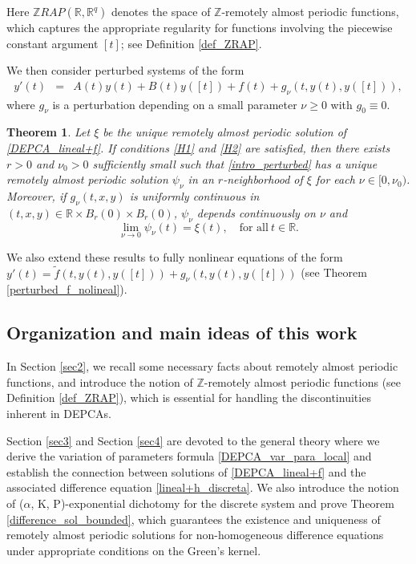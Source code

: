 \documentclass[english,,reqno]{amsart}
\numberwithin{equation}{section}
\theoremstyle{plain}
\newtheorem{thm}{Theorem}[section]
\theoremstyle{definition}
\theoremstyle{remark}
\begin{document}
Here $\mathbb{Z}RAP(\mathbb{R}, \mathbb{R}^q)$ denotes the space of $\mathbb{Z}$-remotely almost periodic functions, which captures the appropriate regularity for functions involving the piecewise constant argument $[t]$; see Definition \ref{def_ZRAP}.

We then consider perturbed systems of the form
\begin{eqnarray}
y'(t) &=& A(t)y(t) + B(t)y([t]) + f(t) + g_{\nu}(t, y(t), y([t])), \label{intro_perturbed}
\end{eqnarray}
where $g_{\nu}$ is a perturbation depending on a small parameter $\nu \geq 0$ with $g_0 \equiv 0$.

\begin{thm}\label{teo_perturbada_depca}
Let $\xi$ be the unique remotely almost periodic solution of \eqref{DEPCA_lineal+f}.  
If conditions \ref{H1} and \ref{H2} are satisfied,  
then there exists $r > 0$ and $\nu_0 > 0$ sufficiently small such that \eqref{intro_perturbed}  
has a unique remotely almost periodic solution $\psi_\nu$ in an $r$-neighborhood of $\xi$  
for each $\nu \in [0, \nu_0)$.  
Moreover, if $g_\nu(t, x, y)$ is uniformly continuous in $(t, x, y) \in \mathbb{R} \times B_r(0) \times B_r(0)$,  
 $\psi_\nu$ depends continuously on $\nu$ and  
\[
\lim_{\nu \to 0} \psi_\nu(t) = \xi(t), \quad \mbox{for all}~{} t\in\mathbb{R}.
\]
\end{thm}

We also extend these results to fully nonlinear equations of the form $y'(t) = \tilde{f}(t, y(t), y([t])) + g_{\nu}(t, y(t), y([t]))$ (see Theorem \ref{perturbed_f_nolineal}).



\subsection{Organization and main ideas of this work} 
In Section \ref{sec2}, we recall some necessary facts about remotely almost periodic functions, and introduce the notion of $\mathbb{Z}$-remotely almost periodic functions (see Definition \ref{def_ZRAP}), which is essential for handling the discontinuities inherent in DEPCAs.

Section \ref{sec3} and Section \ref{sec4} are devoted to the general theory where we derive the variation of parameters formula \eqref{DEPCA_var_para_local} and establish the connection between solutions of \eqref{DEPCA_lineal+f} and the associated difference equation \eqref{lineal+h_discreta}. We also introduce the notion of ($\alpha$, K, P)-exponential dichotomy for the discrete system and prove Theorem \ref{difference_sol_bounded}, which guarantees the existence and uniqueness of remotely almost periodic solutions for non-homogeneous difference equations under appropriate conditions on the Green's kernel. 
\end{document}

